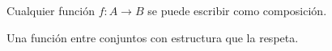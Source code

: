 \documentclass{scrartcl}
\newcounter{definicion}
\begin{document}
\begin{teorema}[Hola]\label{TeoIso}
Cualquier función \( f : A \to B \) se puede escribir como composición.
\end{teorema}

\begin{definicion}[Morfismo]
Una función entre conjuntos con estructura que la respeta.
\end{definicion}
\end{document}
